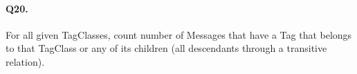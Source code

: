 \paragraph{Q20.}
For all given TagClasses, count number of Messages that have a Tag that
belongs to that TagClass or any of its children (all descendants through
a transitive relation).
